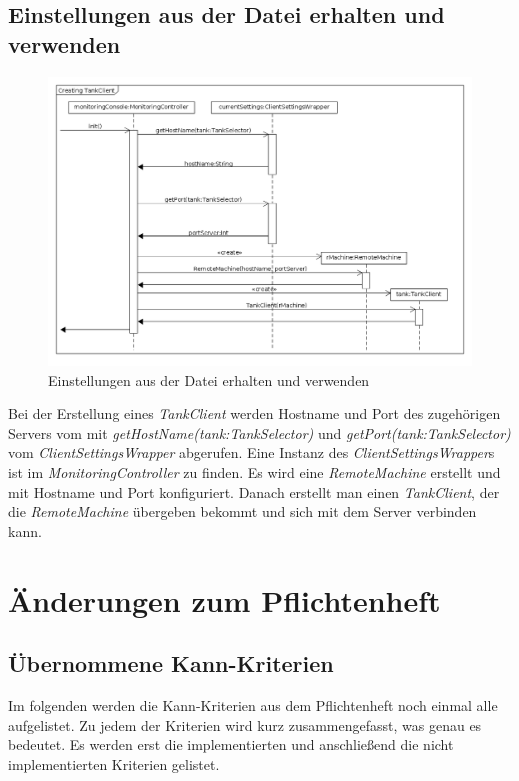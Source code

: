 \documentclass[parskip=full]{scrartcl}
\begin{document}
\subsection{Einstellungen aus der Datei erhalten und verwenden}
\begin{figure}[H]
  \centering
  \includegraphics[scale=0.4]{design/sequence-diagrams/getting-networking-settings.png}
  \caption{Einstellungen aus der Datei erhalten und verwenden}
\end{figure}
Bei der Erstellung eines \emph{TankClient} werden Hostname und Port des zugehörigen Servers vom mit \emph{getHostName(tank:TankSelector)}
und \emph{getPort(tank:TankSelector)} vom \emph{ClientSettingsWrapper} abgerufen. Eine Instanz des \emph{ClientSettingsWrapper}s
ist im \emph{MonitoringController} zu finden. Es wird eine \emph{RemoteMachine} erstellt und mit Hostname und Port konfiguriert.
Danach erstellt man einen \emph{TankClient}, der die \emph{RemoteMachine} übergeben bekommt und sich mit dem Server verbinden kann.

\pagebreak
\section{Änderungen zum Pflichtenheft}

\subsection{\"Ubernommene Kann-Kriterien}
Im folgenden werden die Kann-Kriterien aus dem Pflichtenheft noch einmal alle aufgelistet. Zu jedem der Kriterien wird
kurz zusammengefasst, was genau es bedeutet. Es werden erst die implementierten und anschlie{\ss}end die nicht implementierten
Kriterien gelistet.
\end{document}
